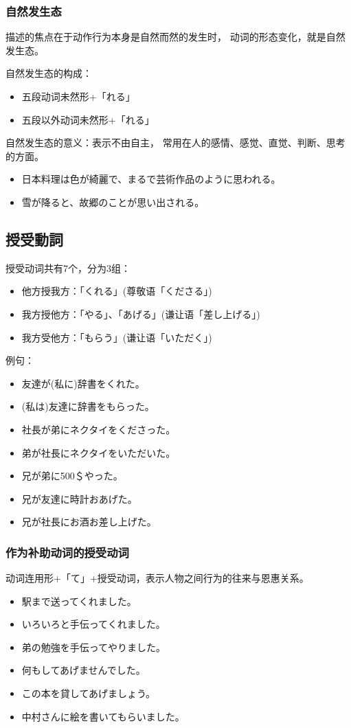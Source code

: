 \subsubsection{自然发生态}%

描述的焦点在于动作行为本身是自然而然的发生时，
动词的形态变化，就是自然发生态。

自然发生态的构成：
\begin{itemize}
  \item 五段动词未然形+「れる」
  \item 五段以外动词未然形+「れる」
\end{itemize}

自然发生态的意义：表示不由自主，
常用在人的感情、感觉、直觉、判断、思考的方面。
\begin{itemize}
  \item 日本料理は色が綺麗で、まるで芸術作品のように思われる。
  \item 雪が降ると、故郷のことが思い出される。
\end{itemize}



\subsection{授受動詞}%

授受动词共有7个，分为3组：
\begin{itemize}
  \item 他方授我方：「くれる」(尊敬语「くださる」)
  \item 我方授他方：「やる」、「あげる」(谦让语「差し上げる」)
  \item 我方受他方：「もらう」(谦让语「いただく」)
\end{itemize}

例句：
\begin{itemize}
  \item 友達が(私に)辞書をくれた。
  \item (私は)友達に辞書をもらった。
  \item 社長が弟にネクタイをくださった。
  \item 弟が社長にネクタイをいただいた。
  \item 兄が弟に500＄やった。
  \item 兄が友達に時計おあげた。
  \item 兄が社長にお酒お差し上げた。
\end{itemize}


\subsubsection{作为补助动词的授受动词}%

动词连用形+「て」+授受动词，表示人物之间行为的往来与恩惠关系。
\begin{itemize}
  \item 駅まで送ってくれました。
  \item いろいろと手伝ってくれました。
  \item 弟の勉強を手伝ってやりました。
  \item 何もしてあげませんでした。
  \item この本を貸してあげましょう。
  \item 中村さんに絵を書いてもらいました。
\end{itemize}



